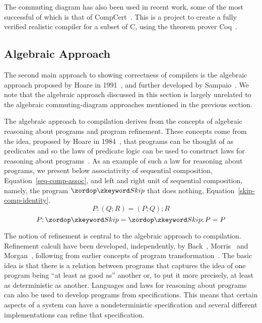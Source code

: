 \documentclass[a4paper,10pt]{report}
\begin{document}
The commuting diagram has also been used in recent work, some of the
most successful of which is that of CompCert~\cite{leroy2009a,
  leroy2009b, leroy2012}.
This is a project to create a fully verified realistic compiler for a
subset of C, using the theorem prover Coq~\cite{coq2004}.

\subsection{Algebraic Approach}
\label{algebraic-approach-subsection}

The second main approach to showing correctness of compilers is the
algebraic approach proposed by Hoare in 1991~\cite{hoare1991}, and
further developed by Sampaio~\cite{hoare1993, sampaio1993,
  sampaio1997}.
We note that the algebraic approach discussed in this section is
largely unrelated to the algebraic commuting-diagram approaches
mentioned in the previous section.

The algebraic approach to compilation derives from the concepts of
algebraic reasoning about programs and program refinement.
These concepts come from the idea, proposed by Hoare in
1984~\cite{hoare1984}, that programs can be thought of as predicates
and so the laws of predicate logic can be used to construct laws for
reasoning about programs~\cite{hoare1987}.
As an example of such a law for reasoning about programs, we present
below associativity of sequential composition,
Equation~\eqref{seq-comp-assoc}, and left and right unit of sequential
composition, namely, the program $\Skip$ that does nothing,
Equation~\eqref{skip-comp-identity}.
\begin{equation}
  \label{seq-comp-assoc}
  P;(Q;R) = (P;Q);R
\end{equation}
\begin{equation}
  \label{skip-comp-identity}
  P;\Skip = \Skip;P = P
\end{equation}

The notion of refinement is central to the algebraic approach to
compilation.
Refinement calculi have been developed, independently, by
Back~\cite{back1981}, Morris~\cite{morris1987} and
Morgan~\cite{morgan1990}, following from earlier concepts of program
transformation~\cite{bauer1976, balzer1976, standish1976, arsac1979}.
The basic idea is that there is a relation between programs that
captures the idea of one program being ``at least as good as'' another
or, to put it more precisely, at least as deterministic as another.
Languages and laws for reasoning about programs can also be used to
develop programs from specifications.
This means that certain aspects of a system can have a
nondeterministic specification and several different implementations
can refine that specification.
\end{document}
